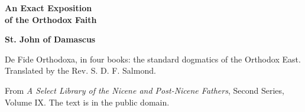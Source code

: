 \documentclass[11pt,letterpaper]{article}
\begin{document}
\color{ink}

\begin{titlepage}
\centering
\vspace*{4em}
{\LARGE\bfseries\color{heading} An Exact Exposition\\[0.3em]of the Orthodox Faith\par}
\vspace{2em}
{\Large\bfseries\color{heading} St. John of Damascus\par}
\vspace{2.5em}
{\itshape\color{subhead}\parbox{0.8\linewidth}{\centering De Fide Orthodoxa, in four books: the standard dogmatics of the Orthodox East. Translated by the Rev. S. D. F. Salmond.\par}}
\vfill
{\small From \emph{A Select Library of the Nicene and Post-Nicene Fathers}, Second Series, Volume IX. The text is in the public domain.\par}
\vspace{2em}
\end{titlepage}

\tableofcontents


\end{document}
